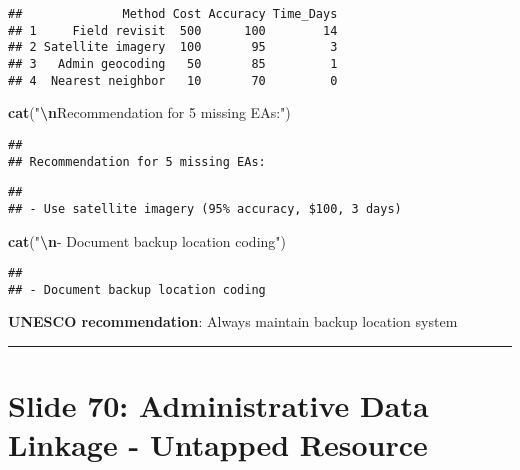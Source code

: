 \documentclass[
]{article}
\newenvironment{Shaded}{\begin{snugshade}}{\end{snugshade}}
\newcommand{\FunctionTok}[1]{\textcolor[rgb]{0.13,0.29,0.53}{\textbf{#1}}}
\newcommand{\NormalTok}[1]{#1}
\newcommand{\SpecialCharTok}[1]{\textcolor[rgb]{0.81,0.36,0.00}{\textbf{#1}}}
\newcommand{\StringTok}[1]{\textcolor[rgb]{0.31,0.60,0.02}{#1}}
\begin{document}
\begin{verbatim}
##              Method Cost Accuracy Time_Days
## 1     Field revisit  500      100        14
## 2 Satellite imagery  100       95         3
## 3   Admin geocoding   50       85         1
## 4  Nearest neighbor   10       70         0
\end{verbatim}

\begin{Shaded}
\begin{Highlighting}[]
\FunctionTok{cat}\NormalTok{(}\StringTok{"}\SpecialCharTok{\textbackslash{}n}\StringTok{Recommendation for 5 missing EAs:"}\NormalTok{)}
\end{Highlighting}
\end{Shaded}

\begin{verbatim}
## 
## Recommendation for 5 missing EAs:
\end{verbatim}

\begin{Shaded}
\end{Shaded}

\begin{verbatim}
## 
## - Use satellite imagery (95% accuracy, $100, 3 days)
\end{verbatim}

\begin{Shaded}
\begin{Highlighting}[]
\FunctionTok{cat}\NormalTok{(}\StringTok{"}\SpecialCharTok{\textbackslash{}n}\StringTok{{-} Document backup location coding"}\NormalTok{)}
\end{Highlighting}
\end{Shaded}

\begin{verbatim}
## 
## - Document backup location coding
\end{verbatim}

\textbf{UNESCO recommendation}: Always maintain backup location system

\begin{center}\rule{0.5\linewidth}{0.5pt}\end{center}

\section{Slide 70: Administrative Data Linkage - Untapped
Resource}\label{slide-70-administrative-data-linkage---untapped-resource}
\end{document}
